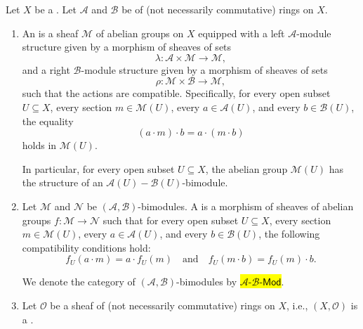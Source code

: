 \begin{definition} \label{definition:module_over_a_sheaf_of_rings_on_a_ringed_space}
    Let $X$ be a . Let $\mathcal{A}$ and $\mathcal{B}$ be  of (not necessarily commutative) rings on $X$.

    \begin{enumerate}
        \item
        An  is a sheaf $\mathcal{M}$ of abelian groups on $X$ equipped with a left $\mathcal{A}$-module structure given by a morphism of sheaves of sets
        $$ \lambda: \mathcal{A} \times \mathcal{M} \longrightarrow \mathcal{M}, $$
        and a right $\mathcal{B}$-module structure given by a morphism of sheaves of sets
        $$ \rho: \mathcal{M} \times \mathcal{B} \longrightarrow \mathcal{M}, $$
        such that the actions are compatible. Specifically, for every open subset $U \subseteq X$, every section $m \in \mathcal{M}(U)$, every $a \in \mathcal{A}(U)$, and every $b \in \mathcal{B}(U)$, the equality
        $$ (a \cdot m) \cdot b = a \cdot (m \cdot b) $$
        holds in $\mathcal{M}(U)$.

        In particular, for every open subset $U \subseteq X$, the abelian group $\mathcal{M}(U)$ has the structure of an $\mathcal{A}(U)-\mathcal{B}(U)$-bimodule.

        \item Let $\mathcal{M}$ and $\mathcal{N}$ be $(\mathcal{A}, \mathcal{B})$-bimodules. A  is a morphism of sheaves of abelian groups $f: \mathcal{M} \to \mathcal{N}$ such that for every open subset $U \subseteq X$, every section $m \in \mathcal{M}(U)$, every $a \in \mathcal{A}(U)$, and every $b \in \mathcal{B}(U)$, the following compatibility conditions hold:
        $$ f_U(a \cdot m) = a \cdot f_U(m) \quad \text{and} \quad f_U(m \cdot b) = f_U(m) \cdot b. $$

        We denote the category of $(\mathcal{A}, \mathcal{B})$-bimodules by
        \hl{$\mathcal{A}\text{-}\mathcal{B}\text{-}\mathsf{Mod}$}.

        \item
        Let $\mathcal{O}$ be a sheaf of (not necessarily commutative) rings on $X$, i.e., $(X, \mathcal{O})$ is a .


\end{enumerate}
\end{definition}
